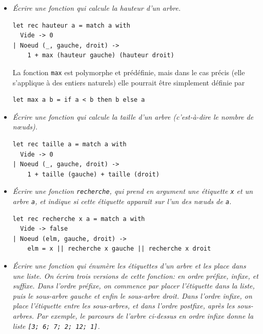 \documentclass[11pt, a4paper]{article}
\begin{document}
\begin{itemize}

         \item \emph{Écrire une fonction qui calcule la hauteur d'un
               arbre.}

               \smallskip

               \begin{verbatim}
let rec hauteur a = match a with
  Vide -> 0
| Noeud (_, gauche, droit) ->
    1 + max (hauteur gauche) (hauteur droit)
               \end{verbatim}

               La fonction \texttt{max} est polymorphe et prédéfinie,
               mais dans le cas précis (elle s'applique à des entiers
               naturels) elle pourrait être simplement définie par

\begin{verbatim}
let max a b = if a < b then b else a
\end{verbatim}

               \smallskip

         \item \emph{Écrire une fonction qui calcule la taille d'un
               arbre (c'est-à-dire le nom\-bre de nœuds).}

               \smallskip

               \begin{verbatim}
let rec taille a = match a with
  Vide -> 0
| Noeud (_, gauche, droit) ->
    1 + taille (gauche) + taille (droit)
               \end{verbatim}

               \smallskip

         \item \emph{Écrire une fonction {\tt recherche}, qui prend en
               argument une étiquette {\tt x} et un arbre {\tt a}, et
               indique si cette étiquette apparaît sur l'un des nœuds
               de {\tt a}.}

               \smallskip

               \begin{verbatim}
let rec recherche x a = match a with
  Vide -> false
| Noeud (elm, gauche, droit) ->
    elm = x || recherche x gauche || recherche x droit
               \end{verbatim}

  \item \emph{Écrire une fonction qui énumère les étiquettes d'un
        arbre et les place dans une liste. On écrira trois versions de
        cette fonction: en ordre préfixe, infixe, et suffixe. Dans
        l'ordre préfixe, on commence par placer l'étiquette dans la
        liste, puis le sous-arbre gauche et enfin le sous-arbre
        droit. Dans l'ordre infixe, on place l'étiquette entre les
        sous-arbres, et dans l'ordre postfixe, après les
        sous-arbres. Par exemple, le parcours de l'arbre ci-dessus en
        ordre infixe donne la liste \texttt{[3; 6; 7; 2; 12; 1]}.}


\end{itemize}
\end{document}
